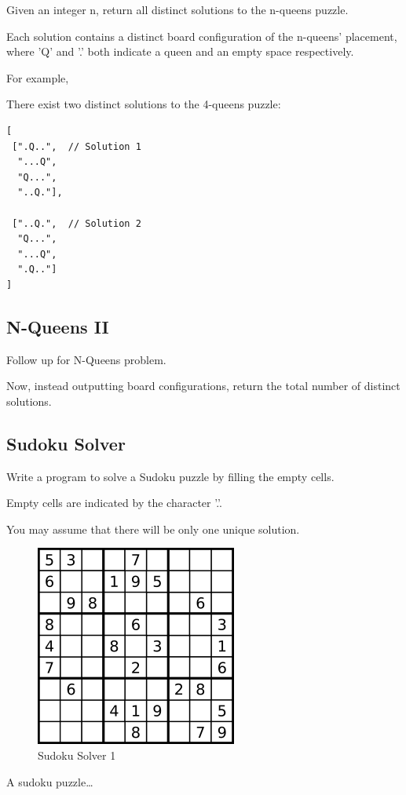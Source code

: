 \documentclass[11pt]{book}
\begin{document}
Given an integer n, return all distinct solutions to the n-queens puzzle.

Each solution contains a distinct board configuration of the n-queens' placement, where 'Q' and '.' both indicate a queen and an empty space respectively.

For example,

There exist two distinct solutions to the 4-queens puzzle:
\lstset{language=java,label= ,caption= ,numbers=none}
\begin{lstlisting}
[
 [".Q..",  // Solution 1
  "...Q",
  "Q...",
  "..Q."],

 ["..Q.",  // Solution 2
  "Q...",
  "...Q",
  ".Q.."]
]
\end{lstlisting}
\subsection{N-Queens II}
\label{sec-16-4-8}
Follow up for N-Queens problem.

Now, instead outputting board configurations, return the total number of distinct solutions.
\subsection{Sudoku Solver}
\label{sec-16-4-9}
Write a program to solve a Sudoku puzzle by filling the empty cells.

Empty cells are indicated by the character '.'.

You may assume that there will be only one unique solution.

\begin{figure}[htb]
\centering
\includegraphics[width=.9\linewidth]{./pic/solveSudoku1.png}
\caption{Sudoku Solver 1}
\end{figure}
A sudoku puzzle\ldots{}
\end{document}
